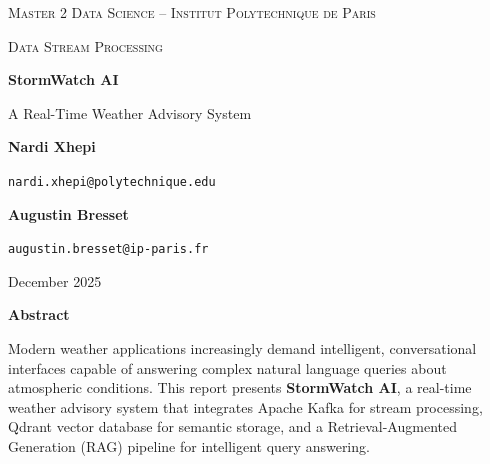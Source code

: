 \documentclass[11pt,a4paper]{article}
\begin{document}
\thispagestyle{empty}

\vspace*{3cm}

\begin{center}
    {\small\textsc{Master 2 Data Science -- Institut Polytechnique de Paris}}
    
    \vspace{0.2cm}
    
    {\small\textsc{Data Stream Processing}}
    
    \vspace{3cm}
    
    {\fontsize{32}{36}\selectfont\textbf{StormWatch AI}}
    
    \vspace{0.5cm}
    
    {\large A Real-Time Weather Advisory System}
    
    \vspace{0.3cm}
        
    \vspace{4cm}
    
    {\large\textbf{Nardi Xhepi}}
    
    {\small\texttt{nardi.xhepi@polytechnique.edu}}
    
    \vspace{0.5cm}
    
    {\large\textbf{Augustin Bresset}}
    
    {\small\texttt{augustin.bresset@ip-paris.fr}}
    
    \vspace{4cm}
    
    {\large December 2025}
    
\end{center}

\newpage

\thispagestyle{empty}
\vspace*{1.5cm}

\begin{center}
    {\Large\color{primary}\textbf{Abstract}}
\end{center}

\vspace{0.8cm}

\noindent
Modern weather applications increasingly demand intelligent, conversational interfaces capable of answering complex natural language queries about atmospheric conditions. This report presents \textbf{StormWatch AI}, a real-time weather advisory system that integrates Apache Kafka for stream processing, Qdrant vector database for semantic storage, and a Retrieval-Augmented Generation (RAG) pipeline for intelligent query answering.
\end{document}
